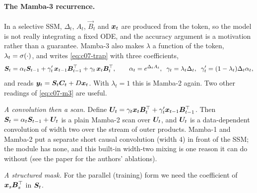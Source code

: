\paragraph{The Mamba-3 recurrence.} In a selective SSM, $\Delta_t$, $A_t$, $\vec B_t$ and $\bm{x}_t$
are produced from the token, so the model is not really integrating a fixed ODE, and the
accuracy argument is a motivation rather than a guarantee. Mamba-3 also makes $\lambda$ a
function of the token, $\lambda_t = \sigma(\cdot)$, and writes \cref{eq:c07-trap} with three
coefficients,
\begin{equation}\label{eq:c07-m3}
  \bm{S}_t = \alpha_t\bm{S}_{t-1} + \gamma'_t\,\bm{x}_{t-1}\bm{B}_{t-1}^{\top} + \gamma_t\,\bm{x}_t\bm{B}_t^{\top},\qquad
  \alpha_t = e^{\Delta_tA_t},\;\; \gamma_t = \lambda_t\Delta_t,\;\; \gamma'_t = (1-\lambda_t)\Delta_t\alpha_t,
\end{equation}
and reads $\bm{y}_t = \bm{S}_t\bm{C}_t + D\bm{x}_t$. With $\lambda_t = 1$ this is Mamba-2 again. Two
other readings of \cref{eq:c07-m3} are useful.

\emph{A convolution then a scan.} Define $\bm{U}_t = \gamma_t\bm{x}_t\bm{B}_t^{\top} + \gamma'_t\bm{x}_{t-1}\bm{B}_{t-1}^{\top}$.
Then $\bm{S}_t = \alpha_t\bm{S}_{t-1} + \bm{U}_t$ is a plain Mamba-2 scan over $\bm{U}_t$, and $\bm{U}_t$ is a
data-dependent convolution of width two over the stream of outer products. Mamba-1 and
Mamba-2 put a separate short causal convolution (width $4$) in front of the SSM; the
 module has none, and this built-in width-two mixing is one reason it can do
without (see the paper for the authors' ablations).

\emph{A structured mask.} For the parallel (training) form we need the coefficient of
$\bm{x}_s\bm{B}_s^{\top}$ in $\bm{S}_t$.

